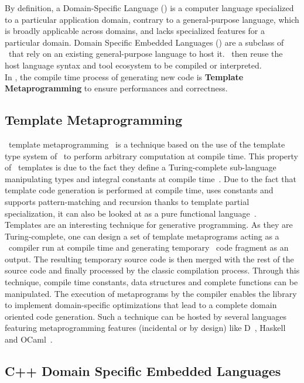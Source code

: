 \documentclass[../../main.tex]{subfiles}
\begin{document}
By definition, a Domain-Specific Language (\dsl) is a computer language
specialized to a particular application domain, contrary to a general-purpose
language, which is broadly applicable across domains, and lacks specialized
features for a particular domain. Domain Specific Embedded Languages (\dsels)
are a subclass of \dsl~that rely on an existing general-purpose language to host
it. \dsels~then reuse the host language syntax and tool ecosystem to be compiled
or interpreted.\\

In \cpp, the compile time process of generating new code is \textbf{Template
Metaprogramming} to ensure performances and correctness.

\subsection{Template Metaprogramming}

\cpp~template metaprogramming~\cite{abrahams:2004} is a technique based on the
use of the template type system of \cpp~to perform arbitrary computation at
compile time. This property of \cpp~templates is due to the fact they
define a Turing-complete sub-language manipulating types and integral constants
at compile time~\cite{unruh:1994}. Due to the fact that template code generation
is performed at compile time, uses constants and supports pattern-matching and
recursion thanks to template partial specialization, it can also be looked
at as a pure functional language~\cite{haeri:2012}.\\

Templates are an interesting technique for generative programming. As they
are Turing-complete, one can design a set of template metaprograms acting as a
\dsl~compiler run at compile time and generating temporary \cpp~code fragment as
an output. The resulting temporary source code is then merged with the rest of
the source code and finally processed by the classic compilation process.
Through this technique, compile time constants, data structures and complete
functions can be manipulated. The execution of metaprograms by the compiler
enables the library to implement domain-specific optimizations that lead to a
complete domain oriented code generation. Such a technique can be hosted by
several languages featuring metaprogramming features (incidental or by design)
like D~\cite{template:dlang}, Haskell~\cite{sheard:2002} and
OCaml~\cite{serot:2008}.

\subsection{C++ Domain Specific Embedded Languages}
\end{document}
